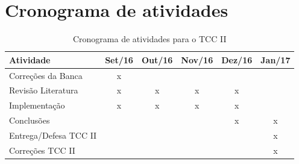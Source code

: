 \section{Cronograma de atividades}

\begin{table}[!hb]
  \centering
  \caption{Cronograma de atividades para o TCC II}
  \begin{tabular}{l||ccccc}
  \hline
  Atividade & Set/16 & Out/16 & Nov/16 & Dez/16 & Jan/17\tabularnewline
  \hline
  \hline
  Correções da Banca & x &  &  &  & \tabularnewline
  Revisão Literatura & x & x & x & x & \tabularnewline
  Implementação & x & x & x & x & \tabularnewline
  Conclusões &  &  &  & x & x\tabularnewline
  Entrega/Defesa TCC II &  &  &  &  & x\tabularnewline
  Correções TCC II &  &  &  &  & x\tabularnewline
  \hline
  \end{tabular}
\end{table}
